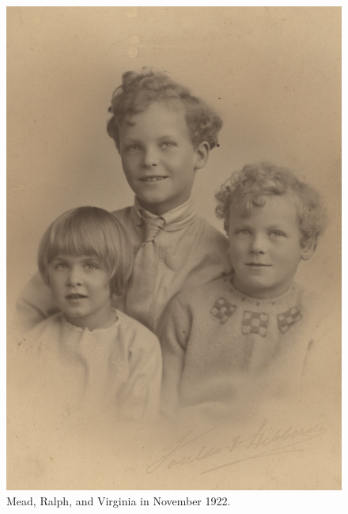 \begin{figure}
\centering
\includegraphics{photos/Mead_Ralph_Virginia_Nov_1922.png}
\caption{Mead, Ralph, and Virginia in November 1922.}
\end{figure}
